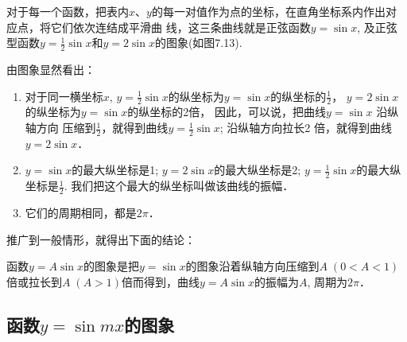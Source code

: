 对于每一个函数，把表内$x$、$y$的每一对值作为点的坐标，在直角坐标系内作出对应点，将它们依次连结成平滑曲
线，这三条曲线就是正弦函数$y=\sin x$, 及正弦型函数$y=\frac{1}{2}\sin x$和$y=2\sin x$的图象(如图7.13).

\begin{figure}[htp]
    \centering
{}
    \caption{}
\end{figure}


由图象显然看出：
\begin{enumerate}
    \item 对于同一横坐标$x$, $y=\frac{1}{2}\sin x$的纵坐标为$y=\sin x$的纵坐标的$\frac{1}{2}$，
    $y=2\sin x$的纵坐标为$y=\sin x$的纵坐标的2倍，
    因此，可以说，把曲线$y=\sin x$ 沿纵轴方向
    压缩到$\frac{1}{2}$，就得到曲线$y=\frac{1}{2}\sin x$; 沿纵轴方向拉长2
倍，就得到曲线$y=2\sin x$．

\item $y=\sin x$的最大纵坐标是1; $y=2\sin x$的最大纵坐标是2; $y=\frac{1}{2}\sin x$的最大纵坐标是$\frac{1}{2}$. 我们把这个最大的纵坐标叫做该曲线的振幅．
\item 它们的周期相同，都是$2\pi$．
\end{enumerate}

推广到一般情形，就得出下面的结论：

\begin{blk}{}
    函数$y=A\sin x$的图象是把$y=\sin x$的图象沿着纵轴方向压缩到$A\; (0<A<1)$倍或拉长到$A\; (A>1)$倍而得到，曲线$y=A\sin x$的振幅为$A$, 周期为$2\pi$．
\end{blk}

\subsection{函数$y=\sin mx$的图象}

